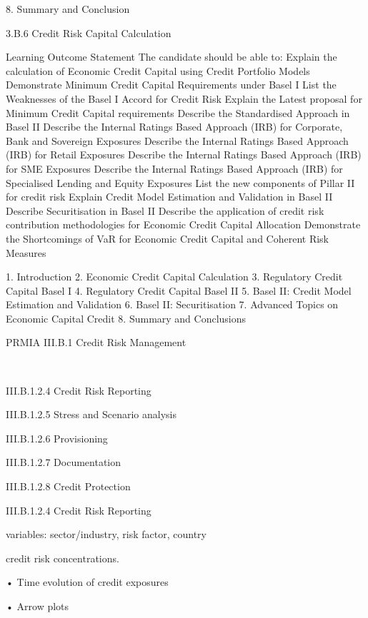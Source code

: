 8. Summary and Conclusion





3.B.6 Credit Risk Capital Calculation

Learning Outcome Statement
The candidate should be able to:
 Explain the calculation of Economic Credit Capital using Credit
Portfolio Models
 Demonstrate Minimum Credit Capital Requirements under Basel I
 List the Weaknesses of the Basel I Accord for Credit Risk
 Explain the Latest proposal for Minimum Credit Capital requirements
 Describe the Standardised Approach in Basel II
 Describe the Internal Ratings Based Approach (IRB) for Corporate, Bank and
Sovereign Exposures
 Describe the Internal Ratings Based Approach (IRB) for Retail Exposures
 Describe the Internal Ratings Based Approach (IRB) for SME Exposures
 Describe the Internal Ratings Based Approach (IRB) for Specialised Lending
and Equity Exposures
 List the new components of Pillar II for credit risk
 Explain Credit Model Estimation and Validation in Basel II
 Describe Securitisation in Basel II
 Describe the application of credit risk contribution methodologies for
Economic Credit Capital Allocation
 Demonstrate the Shortcomings of VaR for Economic Credit Capital and
Coherent Risk Measures


1. Introduction
2. Economic Credit Capital Calculation
3. Regulatory Credit Capital Basel I
4. Regulatory Credit Capital Basel II
5. Basel II: Credit Model Estimation and Validation
6. Basel II: Securitisation
7. Advanced Topics on Economic Capital Credit
8. Summary and Conclusions


PRMIA III.B.1 Credit Risk Management

 

 



III.B.1.2.4 Credit Risk Reporting

III.B.1.2.5 Stress and Scenario analysis

III.B.1.2.6 Provisioning

III.B.1.2.7 Documentation

III.B.1.2.8 Credit Protection


III.B.1.2.4 Credit Risk Reporting

variables: sector/industry, risk factor, country

credit risk concentrations.

 
•
Time evolution of credit exposures

•
Arrow plots

